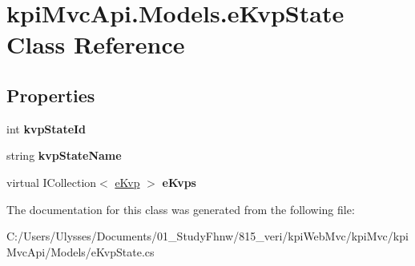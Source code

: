 \hypertarget{classkpi_mvc_api_1_1_models_1_1e_kvp_state}{}\section{kpi\+Mvc\+Api.\+Models.\+e\+Kvp\+State Class Reference}
\label{classkpi_mvc_api_1_1_models_1_1e_kvp_state}
\subsection*{Properties}
\begin{DoxyCompactItemize}
\item 
\mbox{\label{classkpi_mvc_api_1_1_models_1_1e_kvp_state_a7f49bb6e3a794516517e0769c1cf7a8c}} 
int {\bfseries kvp\+State\+Id}
\item 
\mbox{\label{classkpi_mvc_api_1_1_models_1_1e_kvp_state_a9b2d8289cd2a9af4d0ae37e3fc333907}} 
string {\bfseries kvp\+State\+Name}
\item 
\mbox{\label{classkpi_mvc_api_1_1_models_1_1e_kvp_state_ab5c7dccc3dc59e1c06905b17ae2170a5}} 
virtual I\+Collection$<$ \hyperlink{classkpi_mvc_api_1_1_models_1_1e_kvp}{e\+Kvp} $>$ {\bfseries e\+Kvps}
\end{DoxyCompactItemize}


The documentation for this class was generated from the following file\+:\begin{DoxyCompactItemize}
\item 
C\+:/\+Users/\+Ulysses/\+Documents/01\+\_\+\+Study\+Fhnw/815\+\_\+veri/kpi\+Web\+Mvc/kpi\+Mvc/kpi\+Mvc\+Api/\+Models/e\+Kvp\+State.\+cs\end{DoxyCompactItemize}
